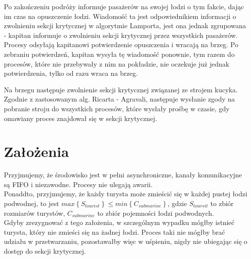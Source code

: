 \documentclass[a4paper]{article}
\begin{document}
Po zakończeniu podróży informuje pasażerów na swojej łodzi o tym fakcie, dając im czas na opuszczenie łodzi. Wiadomość ta jest odpowiednikiem informacji o zwolnieniu sekcji krytycznej w algorytmie Lamporta,
jest ona jednak zgrupowana - kapitan informuje o zwolnieniu sekcji krytycznej przez wszystkich pasażerów. Procesy odsyłają kapitanowi potwierdzenie opuszczenia i wracają na brzeg.
Po zebraniu potwierdzeń, kapitan wysyła tę wiadomość ponownie, tym razem do procesów, które nie przebywały z nim na pokładzie, nie oczekuje już jednak potwierdzenia, tylko od razu wraca na brzeg.

Na brzegu następuje zwolnienie sekcji krytycznej związanej ze strojem kucyka. Zgodnie z zastosowanym alg. Ricarta - Agravali, następuje wysłanie zgody na pobranie stroju do wszystkich
procesów, które wysłały prośbę w czasie, gdy omawiany proces znajdował się w sekcji krytycznej.

\resetlinenumber[1]\linenumbers
\section{Założenia}

Przyjmujemy, że środowisko jest w pełni asynchroniczne, 
kanały komunikacyjne są FIFO i niezawodne. Procesy nie ulegają awarii.\\
Ponaddto, przyjmujemy, że każdy turysta może zmieścić się w każdej pustej łodzi podwodnej, to jest
$max\left\{S_{tourist}\right\} \leq min\left\{C_{submarine}\right\}$,
gdzie $S_{toursit}$ to zbiór rozmiarów turystów,
$C_{submarine}$ to zbiór pojemności łodzi podwodnych.\\
Gdyby zrezygnować z tego założenia, w szczególnym wypadku mógłby istnieć turysta,
który nie zmieści się na żadnej łodzi. Proces taki nie mógłby brać udziału w przetwarzaniu,
pozostawałby więc w uśpieniu, nigdy nie ubiegając się o dostęp do sekcji krytycznej.

\resetlinenumber[1]\linenumbers
\end{document}

